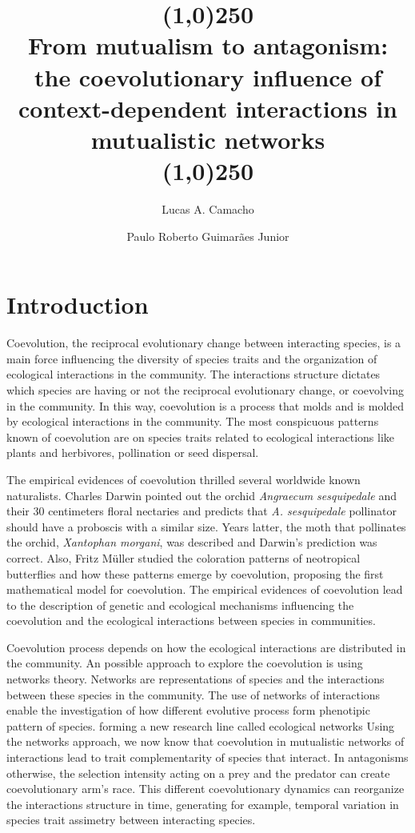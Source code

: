 \documentclass[a4paper, 12pt]{article}
\title{\line(1,0){250}\\From mutualism to antagonism: the coevolutionary influence of  context-dependent interactions in mutualistic networks\\\line(1,0){250}}
\author[1]{Lucas A. Camacho}
\author[2]{Paulo Roberto Guimarães Junior}
\affil[1,2]{Departamento de Ecologia, Universidade de São Paulo, Rua do Matão, travessa 14, nº 321, Cidade Universitária, São Paulo - SP, CEP: 05508-090, Brasil.}
\begin{document}
\maketitle

\section{Introduction}
Coevolution, the reciprocal evolutionary change between interacting species, is a main force influencing the diversity of species traits and the organization of ecological interactions in the community. 
The interactions structure dictates which species are having or not the reciprocal evolutionary change, or coevolving in the community. 
In this way, coevolution is a process that molds and is molded by ecological interactions in the community. 
The most conspicuous patterns known of coevolution are on species traits related to ecological interactions like plants and herbivores, pollination or seed dispersal.

\par The empirical evidences of coevolution thrilled several worldwide known naturalists. 
Charles Darwin pointed out  the orchid \textit{Angraecum sesquipedale} and their 30 centimeters floral nectaries and predicts that \textit{A. sesquipedale} pollinator should have a proboscis with a similar size. 
Years latter, the moth that pollinates the orchid, \textit{Xantophan morgani}, was described and Darwin's prediction was correct. 
Also, Fritz Müller studied the coloration patterns of neotropical butterflies and how these patterns emerge by coevolution, proposing the first mathematical model for coevolution. 
The empirical evidences of coevolution lead to the description of genetic and ecological mechanisms influencing the coevolution and the ecological interactions between species in communities.

\par Coevolution process depends on how the ecological interactions are distributed in the community.
An possible approach to explore the coevolution is using networks theory. Networks are representations of species and the interactions between these species in the community.
The use of networks of interactions enable the investigation of how different evolutive process form phenotipic pattern of species. forming a new research line called ecological networks
Using the networks approach, we now know that coevolution in mutualistic networks of interactions lead to trait complementarity of species that interact. In antagonisms otherwise, the selection intensity acting on a prey and the predator can create coevolutionary arm's race. 
This different coevolutionary dynamics can reorganize the interactions structure in time, generating for example, temporal variation in species trait assimetry between interacting species.
\end{document}
